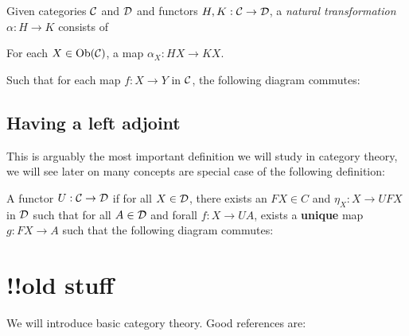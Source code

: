 \begin{defin}
    Given categories $\mathcal{C}$ and $\mathcal{D}$ and functors $H, K : \mathcal{C} \to \mathcal{D}$, a \textit{natural transformation} $\alpha : H \to K$ consists of
    \begin{itemize}
        For each $X\in \text{Ob}(\mathcal{C})$, a map $\alpha_X : H X \to K X$.
    \end{itemize}
    Such that for each map $f : X \to Y$ in $\mathcal{C}$, the following diagram commutes:
    \begin{center}
    \end{center}
\end{defin}

\subsection{Having a left adjoint}

This is arguably the most important definition we will study in category theory, we will see later on many concepts are special case of the following definition:

\begin{defin}
    A functor $U : \mathcal{C} \to \mathcal{D}$  if for all $X \in \mathcal{D}$, there exists an $FX \in C$ and $\eta_X : X \to UFX$ in $\mathcal{D}$ such that for all $A \in \mathcal{D}$ and forall $f : X \to UA$, \there exists a \textbf{unique} map $g : FX \to A$ such that the following diagram commutes:
    \begin{center}
    \end{center}
\end{defin}

\section{!!old stuff}

We will introduce basic category theory. Good references are: \cite{category, BarrWellsCTCS, MacLaneSaunders1998Cftw,rotman2008introduction}

